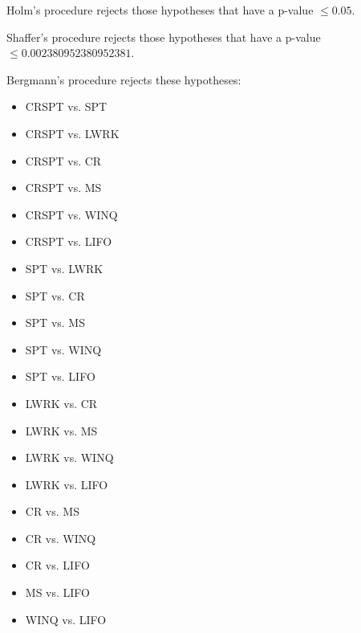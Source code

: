 \documentclass[a3paper,10pt]{article}
\begin{document}
Holm's procedure rejects those hypotheses that have a p-value $\le0.05$.


Shaffer's procedure rejects those hypotheses that have a p-value $\le0.002380952380952381$.


Bergmann's procedure rejects these hypotheses:


\begin{itemize}


\item CRSPT vs. SPT
\item CRSPT vs. LWRK
\item CRSPT vs. CR
\item CRSPT vs. MS
\item CRSPT vs. WINQ
\item CRSPT vs. LIFO
\item SPT vs. LWRK
\item SPT vs. CR
\item SPT vs. MS
\item SPT vs. WINQ
\item SPT vs. LIFO
\item LWRK vs. CR
\item LWRK vs. MS
\item LWRK vs. WINQ
\item LWRK vs. LIFO
\item CR vs. MS
\item CR vs. WINQ
\item CR vs. LIFO
\item MS vs. LIFO
\item WINQ vs. LIFO
\end{itemize}
\end{document}
